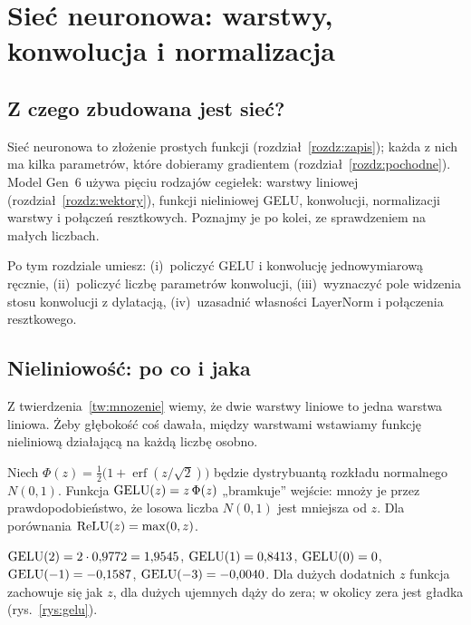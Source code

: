 \chapter{Sieć neuronowa: warstwy, konwolucja i normalizacja}\label{rozdz:siec}

\section{Z czego zbudowana jest sieć?}

Sieć neuronowa to złożenie prostych funkcji (rozdział~\ref{rozdz:zapis}); każda z nich ma kilka parametrów, które dobieramy gradientem
(rozdział~\ref{rozdz:pochodne}). Model Gen~6 używa pięciu rodzajów cegiełek: warstwy liniowej (rozdział~\ref{rozdz:wektory}), funkcji nieliniowej GELU,
konwolucji, normalizacji warstwy i połączeń resztkowych. Poznajmy je po kolei, ze sprawdzeniem na małych liczbach.

Po tym rozdziale umiesz: (i)~policzyć GELU i konwolucję jednowymiarową ręcznie, (ii)~policzyć liczbę parametrów konwolucji,
(iii)~wyznaczyć pole widzenia stosu konwolucji z dylatacją, (iv)~uzasadnić własności LayerNorm i połączenia resztkowego.

\section{Nieliniowość: po co i jaka}

Z twierdzenia~\ref{tw:mnozenie} wiemy, że dwie warstwy liniowe to jedna warstwa liniowa. Żeby głębokość coś dawała, między warstwami wstawiamy funkcję nieliniową działającą na każdą liczbę osobno.

\begin{definicja}[GELU]\label{def:gelu}
Niech $\Phi(z)=\tfrac12\big(1+\operatorname{erf}(z/\sqrt2)\big)$ będzie dystrybuantą rozkładu normalnego $N(0,1)$. Funkcja
$\operatorname{GELU}(z)=z\,\Phi(z)$ „bramkuje” wejście: mnoży je przez prawdopodobieństwo, że losowa liczba $N(0,1)$ jest mniejsza od $z$.
Dla porównania $\operatorname{ReLU}(z)=\max(0,z)$.
\end{definicja}

\begin{przyklad}\label{prz:gelu}
$\operatorname{GELU}(2)=2\cdot0{,}9772=1{,}9545$, $\operatorname{GELU}(1)=0{,}8413$, $\operatorname{GELU}(0)=0$, $\operatorname{GELU}(-1)=-0{,}1587$, $\operatorname{GELU}(-3)=-0{,}0040$.
Dla dużych dodatnich $z$ funkcja zachowuje się jak $z$, dla dużych ujemnych dąży do zera; w okolicy zera jest gładka (rys.~\ref{rys:gelu}).
\end{przyklad}

